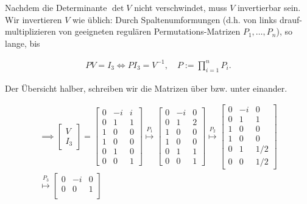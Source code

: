 \begin{solution}
Nachdem die Determinante $\det{V}$ nicht verschwindet, muss $V$ invertierbar sein.
Wir invertieren $V$ wie üblich:
Durch Spaltenumformungen (d.h. von links drauf-multiplizieren von geeigneten regulären Permutations-Matrizen $P_1, \ldots, P_n$), so lange, bis

\begin{align*}
    P V = I_3
    \iff
    P I_3 = V^{-1},
    \quad
    P := \prod_{i=1}^n P_i.
\end{align*}

Der Übersicht halber, schreiben wir die Matrizen über bzw. unter einander.

\begin{multline*}
    \implies
    \begin{bmatrix}
        V \\
        \hline
        I_3
    \end{bmatrix}
    =
    \begin{bmatrix}
        0 & -i & i \\
        0 &  1 & 1 \\
        1 &  0 & 0 \\
        \hline
        1 & 0 & 0 \\
        0 & 1 & 0 \\
        0 & 0 & 1
    \end{bmatrix}
    \stackrel{P_1}{\mapsto}
    \begin{bmatrix}
        0 & -i & 0 \\
        0 &  1 & 2 \\
        1 &  0 & 0 \\
        \hline
        1 & 0 & 0 \\
        0 & 1 & 1 \\
        0 & 0 & 1
    \end{bmatrix}
    \stackrel{P_2}{\mapsto}
    \begin{bmatrix}
        0 & -i & 0 \\
        0 &  1 & 1 \\
        1 &  0 & 0 \\
        \hline
        1 & 0 & 0 \\
        0 & 1 & 1/2 \\
        0 & 0 & 1/2
    \end{bmatrix} \\
    \stackrel{P_3}{\mapsto}
    \begin{bmatrix}
        0 & -i & 0 \\
        0 &  0 & 1 \\

\end{bmatrix}
\end{multline*}
\end{solution}
